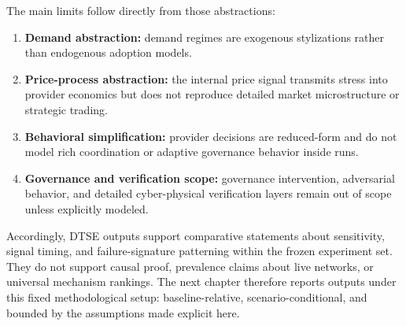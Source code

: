 The main limits follow directly from those abstractions:
\begin{enumerate}
    \item \textbf{Demand abstraction:} demand regimes are exogenous stylizations rather than endogenous adoption models.
    \item \textbf{Price-process abstraction:} the internal price signal transmits stress into provider economics but does not reproduce detailed market microstructure or strategic trading.
    \item \textbf{Behavioral simplification:} provider decisions are reduced-form and do not model rich coordination or adaptive governance behavior inside runs.
    \item \textbf{Governance and verification scope:} governance intervention, adversarial behavior, and detailed cyber-physical verification layers remain out of scope unless explicitly modeled.
\end{enumerate}

Accordingly, DTSE outputs support comparative statements about sensitivity, signal timing, and failure-signature patterning within the frozen experiment set. They do not support causal proof, prevalence claims about live networks, or universal mechanism rankings. The next chapter therefore reports outputs under this fixed methodological setup: baseline-relative, scenario-conditional, and bounded by the assumptions made explicit here.
